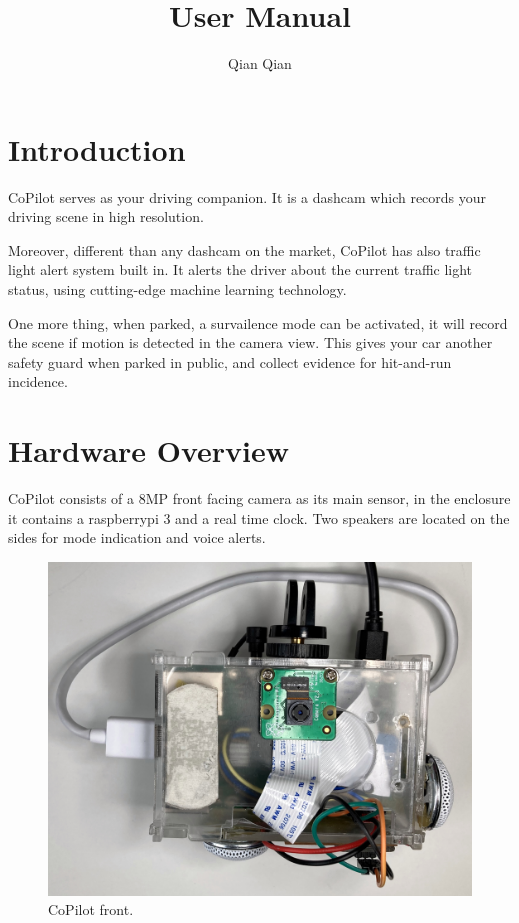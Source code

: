 \documentclass[a4paper]{manual}
\title{User Manual}
\author{Qian Qian}
\begin{document}
\maketitle

\tableofcontents
\newpage

\section{Introduction}
CoPilot serves as your driving companion. It is a dashcam which records your driving scene in high resolution. 

Moreover, different than any dashcam on the market, CoPilot has also traffic light alert system built in. It alerts the driver about the current traffic light status, using cutting-edge machine learning technology. 

One more thing, when parked, a survailence mode can be activated, it will record the scene if motion is detected in the camera view. This gives your car another safety guard when parked in public, and collect evidence for hit-and-run incidence.

\section{Hardware Overview}
CoPilot consists of a 8MP front facing camera as its main sensor, in the enclosure it contains a raspberrypi 3 and a real time clock. Two speakers are located on the sides for mode indication and voice alerts.
\begin{figure}[h!]
  \centering
  \includegraphics[width=.8\textwidth]{pics/front.jpg}
  \caption[]{CoPilot front.}
  \label{fig:front}
\end{figure}
\end{document}
